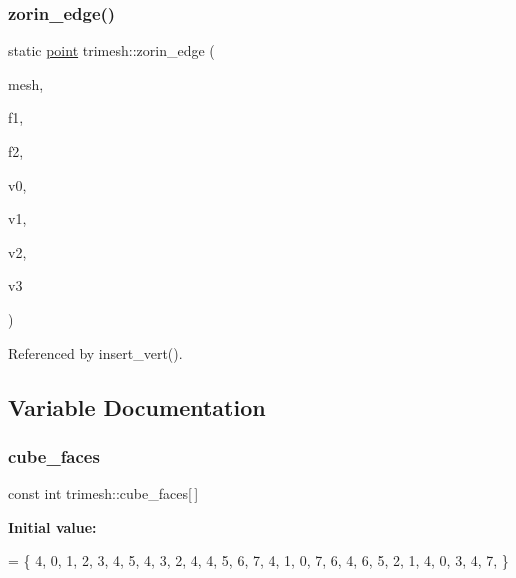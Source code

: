 \mbox{\label{namespacetrimesh_a97f0de0e9ff3f27e57cab46a3d14855c}} 
\subsubsection{\texorpdfstring{zorin\+\_\+edge()}{zorin\_edge()}}
{\footnotesize\ttfamily static \hyperlink{namespacetrimesh_a325b99fd6454b22fa4c4bc3223271b2c}{point} trimesh\+::zorin\+\_\+edge (\begin{DoxyParamCaption}\item[{\hyperlink{classtrimesh_1_1TriMesh}{Tri\+Mesh} $\ast$}]{mesh,  }\item[{int}]{f1,  }\item[{int}]{f2,  }\item[{int}]{v0,  }\item[{int}]{v1,  }\item[{int}]{v2,  }\item[{int}]{v3 }\end{DoxyParamCaption})\hspace{0.3cm}{\ttfamily [static]}}



Referenced by insert\+\_\+vert().



\subsection{Variable Documentation}
\mbox{\label{namespacetrimesh_ab471f8ebb68fbf1b537fa0a1bcdd8ede}} 
\subsubsection{\texorpdfstring{cube\+\_\+faces}{cube\_faces}}
{\footnotesize\ttfamily const int trimesh\+::cube\+\_\+faces\mbox{[}$\,$\mbox{]}\hspace{0.3cm}{\ttfamily [static]}}

{\bfseries Initial value\+:}
\begin{DoxyCode}
= \{
    4, 0, 1, 2, 3,
    4, 5, 4, 3, 2,
    4, 4, 5, 6, 7,
    4, 1, 0, 7, 6,
    4, 6, 5, 2, 1,
    4, 0, 3, 4, 7,
\}
\end{DoxyCode}
\mbox{\label{namespacetrimesh_a2c744a9278fc2a215d1331a113966194}} 
